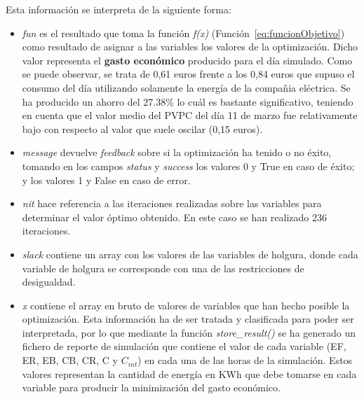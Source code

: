 Esta información se interpreta de la siguiente forma:
\begin{itemize}
\item \textit{fun} es el resultado que toma la función \textit{f(x)} (Función~\ref{eq:funcionObjetivo}) como resultado de asignar a las variables los valores de la optimización. Dicho valor representa el \textbf{gasto económico} producido para el día simulado. Como se puede observar, se trata de 0,61 euros frente a los 0,84 euros que supuso el consumo del día utilizando solamente la energía de la compañia eléctrica. Se ha producido un ahorro del 27.38\% lo cuál es bastante significativo, teniendo en cuenta que el valor medio del \gls{PVPC} del día 11 de marzo fue relativamente bajo con respecto al valor que suele oscilar (0,15 euros).
\item \textit{message} devuelve \textit{feedback} sobre si la optimización ha tenido o no éxito, tomando en los campos \textit{status} y \textit{success} los valores 0 y True en caso de éxito; y los valores 1 y False en caso de error.
\item \textit{nit} hace referencia a las iteraciones realizadas sobre las variables para determinar el valor óptimo obtenido. En este caso se han realizado 236 iteraciones.
\item \textit{slack} contiene un array con los valores de las variables de holgura, donde cada variable de holgura se corresponde con una de las restricciones de desigualdad.
\item \textit{x} contiene el array en bruto de valores de variables que han hecho posible la optimización. Esta información ha de ser tratada y clasificada para poder ser interpretada, por lo que mediante la función \textit{store\_result()} se ha generado un fichero de reporte de simulación que contiene el valor de cada variable (\gls{EF}, \gls{ER}, \gls{EB}, \gls{CB}, \gls{CR}, C y $ C_{int} $) en cada una de las horas de la simulación. Estos valores representan la cantidad de energía en KWh que debe tomarse en cada variable para producir la minimización del gasto económico.
\end{itemize}
